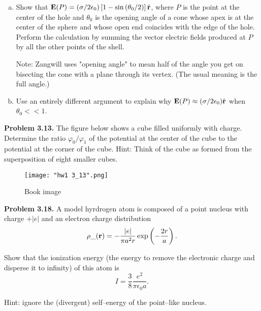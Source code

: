 \documentclass{article}
\begin{document}
\begin{enumerate}[(a)]
\item Show that $\vb{E}(P) = \left(\sigma/2\epsilon _0 \right)\left[1 - \sin \left(\theta _0/2\right)\right]\hat{\vb{r}}$, where $P$ is the point at the center of the hole and $\theta _0$ is the opening angle of a cone whose apex is at the center of the sphere and whose open end coincides with the edge of the hole. Perform the calculation by summing the vector electric fields produced at $P$ by all the other points of the shell.

Note: Zangwill uses "opening angle" to mean half of the angle you get on bisecting the cone with a plane through its vertex. (The usual meaning is the full angle.)

\item Use an entirely different argument to explain why $\vb{E}(P) \approx (\sigma/2\epsilon _0)\hat{\vb{r}}$ when $\theta _0 <\!\!< 1$.
\end{enumerate}
 
\hrulefill

\textbf{Problem 3.13.} The figure below shows a cube filled uniformly with charge. Determine the ratio $\varphi _0/\varphi _1$ of the potential at the center of the cube to the potential at the corner of the cube. Hint: Think of the cube as formed from the superposition of eight smaller cubes.

\begin{figure}[H]%
\centering
\texttt{[image: "hw1 3\_13".png]}
\caption{Book image}
\end{figure}

\hrulefill

\textbf{Problem 3.18.} A model hyrdrogen atom is composed of a point nucleus with charge $+|e|$ and an electron charge distribution
\begin{equation*}
	\rho\_(\vb{r}) = -\frac{|e|}{\pi a^2 r}\exp\left(-\frac{2r}{a}\right).
\end{equation*}

Show that the ionization energy (the energy to remove the electronic charge and disperse it to infinity) of this atom is
\begin{equation*}
	I = \frac{3}{8}\frac{e^2}{\pi\epsilon_0a}.
\end{equation*}

Hint: ignore the (divergent) self--energy of the point--like nucleus.
\end{document}
